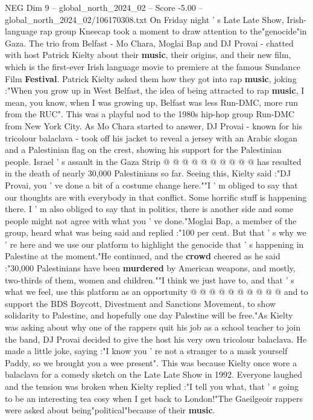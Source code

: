\begin{textsample}{NEG Dim 9 – global\_north\_2024\_02 – Score -5.00 – global\_north\_2024\_02/106170308.txt}  \label{ex:f9_neg_288}
On Friday night ' s Late Late Show, Irish-language rap group Kneecap took a moment to draw attention to the"genocide"in Gaza.
The trio from Belfast - Mo Chara, Moglai Bap and DJ Provai - chatted with host Patrick Kielty about their \textbf{music}, their origins, and their new film, which is the first-ever Irish language movie to premiere at the famous Sundance Film \textbf{Festival}.
Patrick Kielty asked them how they got into rap \textbf{music}, joking :"When you grow up in West Belfast, the idea of being attracted to rap \textbf{music}, I mean, you know, when I was growing up, Belfast was less Run-DMC, more run from the RUC".
This was a playful nod to the 1980s hip-hop group Run-DMC from New York City.
As Mo Chara started to answer, DJ Provai - known for his tricolour balaclava - took off his jacket to reveal a jersey with an Arabic slogan and a Palestinian flag on the crest, showing his support for the Palestinian people.
Israel ' s assault in the Gaza Strip @ @ @ @ @ @ @ @ @ @ has resulted in the death of nearly 30,000 Palestinians so far.
Seeing this, Kielty said :"DJ Provai, you ' ve done a bit of a costume change here.""I ' m obliged to say that our thoughts are with everybody in that conflict.
Some horrific stuff is happening there.
I ' m also obliged to say that in politics, there is another side and some people might not agree with what you ' ve done."Moglai Bap, a member of the group, heard what was being said and replied :"100 per cent.
But that ' s why we ' re here and we use our platform to highlight the genocide that ' s happening in Palestine at the moment."He continued, and the \textbf{crowd} cheered as he said :"30,000 Palestinians have been \textbf{murdered} by American weapons, and mostly, two-thirds of them, women and children.""I think we just have to, and that ' s what we feel, use this platform as an opportunity @ @ @ @ @ @ @ @ @ @ and to support the BDS Boycott, Divestment and Sanctions Movement, to show solidarity to Palestine, and hopefully one day Palestine will be free."As Kielty was asking about why one of the rappers quit his job as a school teacher to join the band, DJ Provai decided to give the host his very own tricolour balaclava.
He made a little joke, saying :"I know you ' re not a stranger to a mask yourself Paddy, so we brought you a wee present".
This was because Kielty once wore a balaclava for a comedy sketch on the Late Late Show in 1992.
Everyone laughed and the tension was broken when Kielty replied :"I tell you what, that ' s going to be an interesting tea cosy when I get back to London!"The Gaeilgeoir rappers were asked about being"political"because of their \textbf{music}.

\end{textsample}
